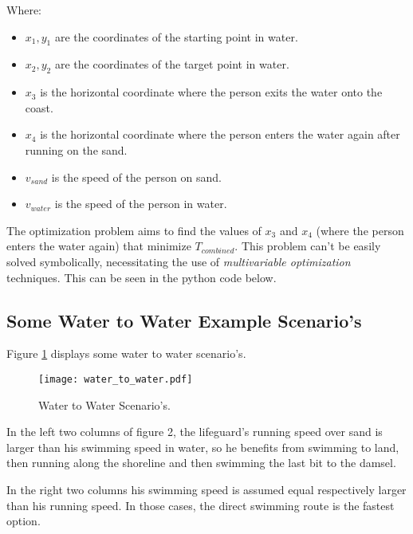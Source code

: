 \documentclass[11pt, a4paper]{article}
\begin{document}
Where:
\begin{itemize}
    \item \( x_1, y_1 \) are the coordinates of the starting point in water.
    \item \( x_2, y_2 \) are the coordinates of the target point in water.
    \item \( x_3 \) is the horizontal coordinate where the person exits the water onto the coast.
    \item \( x_4 \) is the horizontal coordinate where the person enters the water again after running on the sand.
    \item \( v_{sand} \) is the speed of the person on sand.
    \item \( v_{water} \) is the speed of the person in water.
\end{itemize}

The optimization problem aims to find the values of \( x_3 \) and \( x_4 \) (where the person enters the water again)
that minimize \( T_{combined} \). This problem can't be easily solved symbolically, necessitating the use of
\emph{multivariable optimization} techniques. This can be seen in the python code below.

\subsection{Some Water to Water Example Scenario's}

Figure \ref{fig:water_to_water} displays some water to water scenario's.

\begin{figure}[htbp] %
    \centering %
    \texttt{[image: water\_to\_water.pdf]} %
    \caption{Water to Water Scenario's.} %
    \label{fig:water_to_water} %
\end{figure}

In the left two columns of figure 2, the lifeguard's running speed over sand is larger than his swimming speed in water,
so he benefits from swimming to land, then running along the shoreline and then swimming the last bit to the damsel.

In the right two columns his swimming speed is assumed equal respectively larger than his running speed.
In those cases, the direct swimming route is the fastest option.
\end{document}

